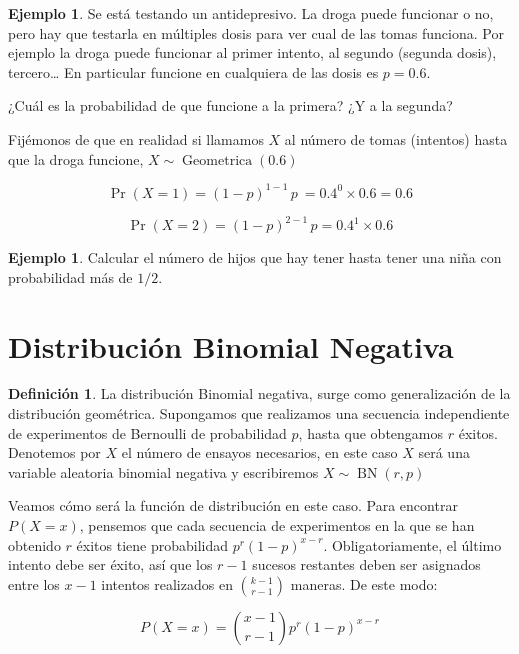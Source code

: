 \documentclass[]{book}
\theoremstyle{plain}
\theoremstyle{definition}
\newtheorem{definition}[theorem]{Definición}
\newtheorem{example}[theorem]{Ejemplo}
\theoremstyle{definition} %
\begin{document}
\begin{example}
   
Se está testando un antidepresivo. La droga puede funcionar o no, pero
hay que testarla en múltiples dosis para ver cual de las tomas funciona.
Por ejemplo la droga puede funcionar al primer intento, al segundo
(segunda dosis), tercero\ldots{} En particular funcione en cualquiera de
las dosis es \(p=0.6\).

¿Cuál es la probabilidad de que funcione a la primera? ¿Y a la segunda?

Fijémonos de que en realidad si llamamos \(X\) al número de tomas
(intentos) hasta que la droga funcione,
\(\displaystyle X\sim \operatorname {Geometrica} (0.6)\)


\[\displaystyle \Pr(X=1)=(1-p)^{1-1}\,p\ =0.4^{0}\times 0.6=0.6\]

\[\displaystyle \Pr(X=2)=(1-p)^{2-1}\,p=0.4^{1}\times 0.6\]
\end{example}

\begin{example} 
Calcular el número de hijos que hay tener hasta tener una niña con
probabilidad más de \(1/2\).
\end{example}



 \section{Distribución Binomial
Negativa} 


\begin{definition}
La distribución Binomial negativa, surge como generalización de la
distribución geométrica. Supongamos que realizamos una secuencia
independiente de experimentos de Bernoulli de probabilidad \(p\), hasta
que obtengamos \(r\) éxitos. Denotemos por \(X\) el número de ensayos
necesarios, en este caso \(X\) será una variable aleatoria binomial
negativa y escribiremos \(\displaystyle X\sim \operatorname {BN} (r,p)\)

Veamos cómo será la función de distribución en este caso. Para encontrar
\(P(X=x)\), pensemos que cada secuencia de experimentos en la que se han
obtenido \(r\) éxitos tiene probabilidad \(p^r(1-p)^{x-r}\).
Obligatoriamente, el último intento debe ser éxito, así que los \(r-1\)
sucesos restantes deben ser asignados entre los \(x-1\) intentos
realizados en \({k-1 \choose r-1}\) maneras. De este modo:

\[P(X=x) = {x-1 \choose r-1} p^r (1-p)^{x-r}\]
\end{definition}
\end{document}
